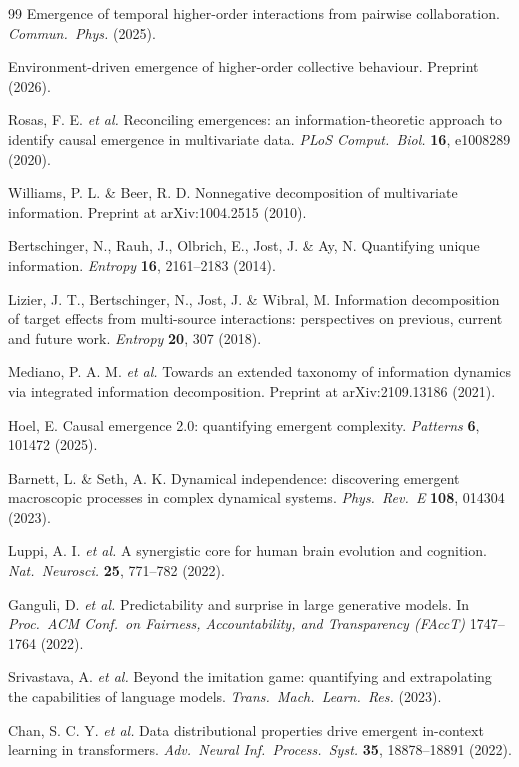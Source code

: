 \documentclass[11pt]{article}
\theoremstyle{definition}
\begin{document}
\begin{thebibliography}{99}
 Emergence of temporal higher-order interactions
from pairwise collaboration. \emph{Commun.\ Phys.} (2025).

 Environment-driven emergence of higher-order
collective behaviour. Preprint (2026).

 Rosas, F. E. \emph{et al.} Reconciling emergences:
an information-theoretic approach to identify causal emergence in
multivariate data. \emph{PLoS Comput.\ Biol.} \textbf{16}, e1008289
(2020).

 Williams, P. L. \& Beer, R. D.
Nonnegative decomposition of multivariate information. Preprint at
arXiv:1004.2515 (2010).

 Bertschinger, N., Rauh, J., Olbrich, E.,
Jost, J. \& Ay, N. Quantifying unique information. \emph{Entropy}
\textbf{16}, 2161--2183 (2014).

 Lizier, J. T., Bertschinger, N., Jost, J. \&
Wibral, M. Information decomposition of target effects from
multi-source interactions: perspectives on previous, current and future
work. \emph{Entropy} \textbf{20}, 307 (2018).

 Mediano, P. A. M. \emph{et al.} Towards an
extended taxonomy of information dynamics via integrated information
decomposition. Preprint at arXiv:2109.13186 (2021).

 Hoel, E. Causal emergence 2.0: quantifying emergent
complexity. \emph{Patterns} \textbf{6}, 101472 (2025).

 Barnett, L. \& Seth, A. K. Dynamical
independence: discovering emergent macroscopic processes in complex
dynamical systems. \emph{Phys.\ Rev.\ E} \textbf{108}, 014304 (2023).

 Luppi, A. I. \emph{et al.} A synergistic core for
human brain evolution and cognition. \emph{Nat.\ Neurosci.}
\textbf{25}, 771--782 (2022).

 Ganguli, D. \emph{et al.} Predictability and
surprise in large generative models. In \emph{Proc.\ ACM Conf.\ on
Fairness, Accountability, and Transparency (FAccT)} 1747--1764 (2022).

 Srivastava, A. \emph{et al.} Beyond the
imitation game: quantifying and extrapolating the capabilities of
language models. \emph{Trans.\ Mach.\ Learn.\ Res.} (2023).

 Chan, S. C. Y. \emph{et al.} Data distributional
properties drive emergent in-context learning in transformers.
\emph{Adv.\ Neural Inf.\ Process.\ Syst.} \textbf{35}, 18878--18891
(2022).


\end{thebibliography}
\end{document}
